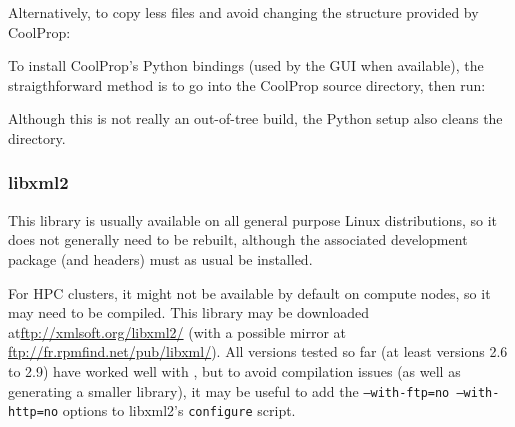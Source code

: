 \documentclass[a4paper,10pt,twoside]{csshortdoc}
\begin{document}
Alternatively, to copy less files and avoid changing the structure provided
by CoolProp:


\sloppy

To install CoolProp's Python bindings (used by the GUI when available),
the straigthforward method is to go into the CoolProp source directory,
then run:


Although this is not really an out-of-tree build, the Python
setup also cleans the directory.

\subsubsection{libxml2\label{sec:ext:libxml2}}

This library is usually available on all general purpose Linux
distributions, so it does not generally need to be rebuilt,
although the associated development package (and headers) must
as usual be installed.

For HPC clusters, it might not be available by default on compute nodes,
so it may need to be compiled. This library may be downloaded
at\url{ftp://xmlsoft.org/libxml2/} (with a possible mirror at
\url{ftp://fr.rpmfind.net/pub/libxml/}). All versions tested so far
(at least versions 2.6 to 2.9) have worked well with \CS, but to avoid
compilation issues (as well as generating a smaller library), it
may be useful to add the \texttt{--with-ftp=no --with-http=no} options
to libxml2's \texttt{configure} script.
\end{document}
